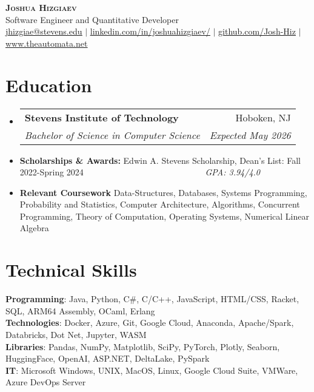 \documentclass[letterpaper,10pt]{article}
\makeatletter
\newcommand{\resumeItem}[1]{
  \item\small{
    {#1 \vspace{-2pt}}
  }
}
\newcommand{\resumeSubheading}[4]{
  \vspace{-2pt}\item
    \begin{tabular*}{0.97\textwidth}[t]{l@{\extracolsep{\fill}}r}
      \textbf{#1} & #2 \\
      \textit{\small#3} & \textit{\small #4} \\
    \end{tabular*}\vspace{-7pt}
}
\newcommand{\resumeSubItem}[1]{\resumeItem{#1}\vspace{-4pt}}
\newcommand{\resumeSubHeadingListStart}{\begin{itemize}[leftmargin=0.15in, label={}]}
\newcommand{\resumeSubHeadingListEnd}{\end{itemize}}
\makeatother
\begin{document}

\begin{center}
    \textbf{\Huge \scshape Joshua Hizgiaev} \\ \vspace{1pt}
    Software Engineer and Quantitative Developer\\
     \href{mailto:jhizgiae@stevens.edu}{\underline{jhizgiae@stevens.edu}} $|$ 
    \href{https://linkedin.com/in/joshuahizgiaev/}{\underline{linkedin.com/in/joshuahizgiaev/}} $|$
    \href{https://github.com/Josh-Hiz}{\underline{github.com/Josh-Hiz}} $|$
    \href{https://www.theautomata.net/}{\underline{www.theautomata.net}}
\end{center}


\section{Education}
  \resumeSubHeadingListStart
    \resumeSubheading
      {Stevens Institute of Technology}{Hoboken, NJ}
      {Bachelor of Science in Computer Science}{Expected May 2026}
    \resumeSubItem{\textbf{Scholarships \& Awards: }Edwin A. Stevens Scholarship, Dean's List: Fall 2022-Spring 2024 \ \ \ \ \ \ \ \ \ \ \ \ \ \ \ \ \ \ \ \ \ \ \ \ \ \ \ \ \textit{GPA: 3.94/4.0}}
    \resumeSubItem{\textbf{Relevant Coursework }Data-Structures, Databases, Systems Programming, Probability and Statistics, Computer Architecture, Algorithms, Concurrent Programming, Theory of Computation, Operating Systems, Numerical Linear Algebra}
  \resumeSubHeadingListEnd

%
\section{Technical Skills}
 \begin{itemize}[leftmargin=0.15in, label={}]
    \small{\item{
     \textbf{Programming}{: Java, Python, C\#, C/C++, JavaScript, HTML/CSS, Racket, SQL,  ARM64 Assembly, OCaml, Erlang} \\
     \textbf{Technologies}{: Docker, Azure, Git, Google Cloud, Anaconda, Apache/Spark, Databricks, Dot Net, Jupyter, WASM} \\
     \textbf{Libraries}{: Pandas, NumPy, Matplotlib, SciPy, PyTorch, Plotly, Seaborn, HuggingFace, OpenAI, ASP.NET, DeltaLake, PySpark} \\
     \textbf{IT}{: Microsoft Windows, UNIX, MacOS, Linux, Google Cloud Suite, VMWare, Azure DevOps Server}
    }}
 \end{itemize}
\end{document}
